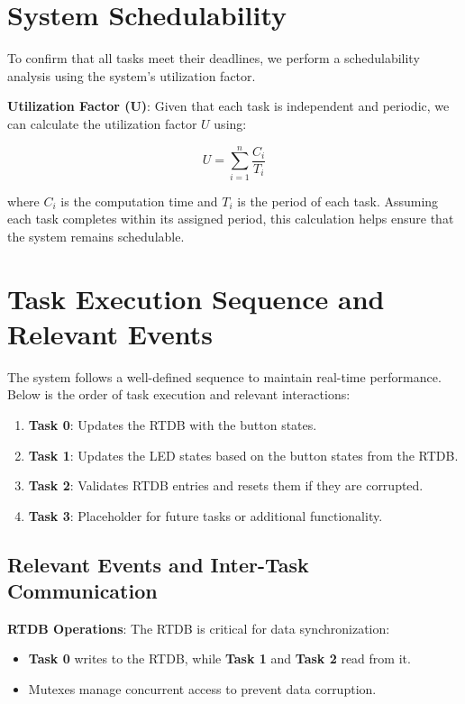 \documentclass[a4paper,12pt]{article}
\begin{document}
\section{System Schedulability}
To confirm that all tasks meet their deadlines, we perform a schedulability analysis using the system's utilization factor.

\textbf{Utilization Factor (U)}: Given that each task is independent and periodic, we can calculate the utilization factor \( U \) using:

\[
U = \sum_{i=1}^n \frac{C_i}{T_i}
\]

where \( C_i \) is the computation time and \( T_i \) is the period of each task. Assuming each task completes within its assigned period, this calculation helps ensure that the system remains schedulable.

\section{Task Execution Sequence and Relevant Events}
The system follows a well-defined sequence to maintain real-time performance. Below is the order of task execution and relevant interactions:

\begin{enumerate}
    \item \textbf{Task 0}: Updates the RTDB with the button states.
    \item \textbf{Task 1}: Updates the LED states based on the button states from the RTDB.
    \item \textbf{Task 2}: Validates RTDB entries and resets them if they are corrupted.
    \item \textbf{Task 3}: Placeholder for future tasks or additional functionality.
\end{enumerate}

\subsection{Relevant Events and Inter-Task Communication}
\textbf{RTDB Operations}: The RTDB is critical for data synchronization:
\begin{itemize}
    \item \textbf{Task 0} writes to the RTDB, while \textbf{Task 1} and \textbf{Task 2} read from it.
    \item Mutexes manage concurrent access to prevent data corruption.
\end{itemize}
\end{document}
